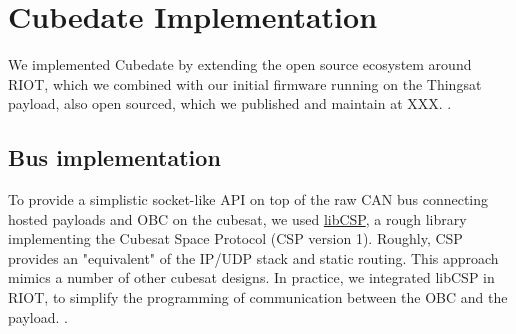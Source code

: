 \section{Cubedate Implementation}
\label{sec:implementation}

\iffalse
SUIT is used in Cubedate payloads as a \textit{Data Delivery Mechanism} bundling
the security properties described in section IV D. The implementation described
next seeks to remain generic to be re-usable in different scenarios while tailored
for the Satellite ThingSat use case.

SUIT state machine running on the deployed device does not need to care about
how this \textit{Data} is delivered or where it will be installed, it just
needs to be handed a \textit{manifest}.

\begin{itemize}
    \item \textbf{Data Resource URI}: a locally (e.g.: mounted USB  device) or remotely
    (HTTP or CoAP endpoint) accessible file.
    \item \textbf{Data Resource Delivery Mechanism}: transport mechanism to deliver SUIT:
    e.g. \{message model, network stack, network interface\}
    bundle, or FileSystem \textit{read/write} functions.
    \textit{manifest} and data resource to the SUIT state machine.
    \item \textbf{Data Resource Installation Storage}: internal or external Volatile or
    Non-volatile storage, e.g. RAM (mission files, FemtoContainers\cite{zandberg2021femto})
    or FileSystem or internal FLASH.
\end{itemize}

As the case where the Data Resource URI points to a locally available is simply a
simplified case, a networked scenario with a URL will be described.

\francisco{PLACE HOLDER FOR A DIAGRAM}
\fi

We implemented Cubedate by extending the open source ecosystem around RIOT, which we combined with our initial firmware running on the Thingsat payload, also open sourced, which we published and maintain at XXX. .


\subsection{Bus implementation}

To provide a simplistic socket-like API on top of the raw CAN bus connecting hosted payloads and OBC on the cubesat, we used \href{https://github.com/libcsp/libcsp}{libCSP}, a rough library implementing the Cubesat Space Protocol (CSP version 1). Roughly, CSP provides an "equivalent" of the IP/UDP stack and static routing. This approach mimics a number of other cubesat designs. In practice, we integrated libCSP in RIOT, to simplify the programming of communication between the OBC and the payload.%
.

